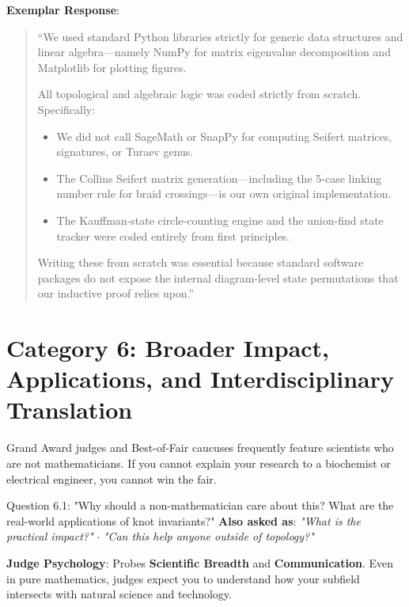 \documentclass[11pt,letterpaper]{article}
\begin{document}
\begin{exemplarbox}
\textbf{Exemplar Response}:
\begin{quote}
``We used standard Python libraries strictly for generic data structures and linear algebra---namely NumPy for matrix eigenvalue decomposition and Matplotlib for plotting figures. 

All topological and algebraic logic was coded strictly from scratch. Specifically:
\begin{itemize}
    \item We did not call SageMath or SnapPy for computing Seifert matrices, signatures, or Turaev genus.
    \item The Collins Seifert matrix generation---including the 5-case linking number rule for braid crossings---is our own original implementation.
    \item The Kauffman-state circle-counting engine and the union-find state tracker were coded entirely from first principles.
\end{itemize}
Writing these from scratch was essential because standard software packages do not expose the internal diagram-level state permutations that our inductive proof relies upon.''
\end{quote}
\end{exemplarbox}

\newpage
\section{Category 6: Broader Impact, Applications, and Interdisciplinary Translation}

Grand Award judges and Best-of-Fair caucuses frequently feature scientists who are not mathematicians. If you cannot explain your research to a biochemist or electrical engineer, you cannot win the fair.

\begin{questionbox}{Question 6.1: "Why should a non-mathematician care about this? What are the real-world applications of knot invariants?"}
\textbf{Also asked as}: \textit{"What is the practical impact?"} $\cdot$ \textit{"Can this help anyone outside of topology?"}
\end{questionbox}

\begin{strategybox}
\textbf{Judge Psychology}: Probes \textbf{Scientific Breadth} and \textbf{Communication}. Even in pure mathematics, judges expect you to understand how your subfield intersects with natural science and technology.
\end{strategybox}
\end{document}
